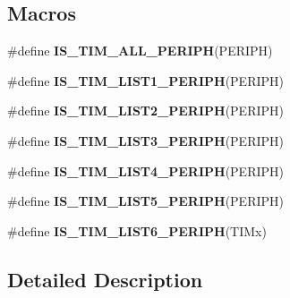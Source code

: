 \subsection*{Macros}
\begin{DoxyCompactItemize}
\item 
\#define {\bfseries I\-S\-\_\-\-T\-I\-M\-\_\-\-A\-L\-L\-\_\-\-P\-E\-R\-I\-P\-H}(P\-E\-R\-I\-P\-H)
\item 
\#define {\bfseries I\-S\-\_\-\-T\-I\-M\-\_\-\-L\-I\-S\-T1\-\_\-\-P\-E\-R\-I\-P\-H}(P\-E\-R\-I\-P\-H)
\item 
\#define {\bfseries I\-S\-\_\-\-T\-I\-M\-\_\-\-L\-I\-S\-T2\-\_\-\-P\-E\-R\-I\-P\-H}(P\-E\-R\-I\-P\-H)
\item 
\#define {\bfseries I\-S\-\_\-\-T\-I\-M\-\_\-\-L\-I\-S\-T3\-\_\-\-P\-E\-R\-I\-P\-H}(P\-E\-R\-I\-P\-H)
\item 
\#define {\bfseries I\-S\-\_\-\-T\-I\-M\-\_\-\-L\-I\-S\-T4\-\_\-\-P\-E\-R\-I\-P\-H}(P\-E\-R\-I\-P\-H)
\item 
\#define {\bfseries I\-S\-\_\-\-T\-I\-M\-\_\-\-L\-I\-S\-T5\-\_\-\-P\-E\-R\-I\-P\-H}(P\-E\-R\-I\-P\-H)
\item 
\#define {\bfseries I\-S\-\_\-\-T\-I\-M\-\_\-\-L\-I\-S\-T6\-\_\-\-P\-E\-R\-I\-P\-H}(T\-I\-Mx)
\end{DoxyCompactItemize}


\subsection{Detailed Description}



